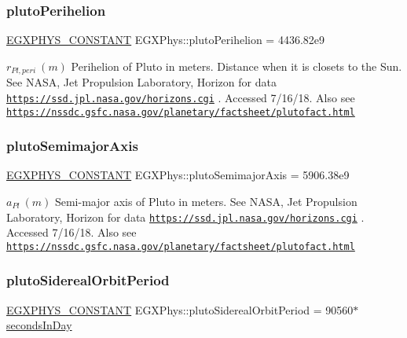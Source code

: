 \subsubsection{\texorpdfstring{pluto\+Perihelion}{plutoPerihelion}}
{\footnotesize\ttfamily \mbox{\hyperlink{group___e_g_x_phys-_constants-_macros_ga76980d288494ce1714c9ac68a95ba702}{E\+G\+X\+P\+H\+Y\+S\+\_\+\+C\+O\+N\+S\+T\+A\+NT}} E\+G\+X\+Phys\+::pluto\+Perihelion = 4436.\+82e9}

$ r_{Pl,peri} \ (m)$ Perihelion of Pluto in meters. Distance when it is closets to the Sun. See N\+A\+SA, Jet Propulsion Laboratory, Horizon for data \href{https://ssd.jpl.nasa.gov/horizons.cgi}{\tt https\+://ssd.\+jpl.\+nasa.\+gov/horizons.\+cgi} . Accessed 7/16/18. Also see \href{https://nssdc.gsfc.nasa.gov/planetary/factsheet/plutofact.html}{\tt https\+://nssdc.\+gsfc.\+nasa.\+gov/planetary/factsheet/plutofact.\+html} \mbox{\label{group___e_g_x_phys-_constants-_astrophysics-_solar_system-_pluto-_orbit_ga86f91cd8a0a651c7c26dcb86120a1d76}} 
\subsubsection{\texorpdfstring{pluto\+Semimajor\+Axis}{plutoSemimajorAxis}}
{\footnotesize\ttfamily \mbox{\hyperlink{group___e_g_x_phys-_constants-_macros_ga76980d288494ce1714c9ac68a95ba702}{E\+G\+X\+P\+H\+Y\+S\+\_\+\+C\+O\+N\+S\+T\+A\+NT}} E\+G\+X\+Phys\+::pluto\+Semimajor\+Axis = 5906.\+38e9}

$ a_{Pl} \ (m)$ Semi-\/major axis of Pluto in meters. See N\+A\+SA, Jet Propulsion Laboratory, Horizon for data \href{https://ssd.jpl.nasa.gov/horizons.cgi}{\tt https\+://ssd.\+jpl.\+nasa.\+gov/horizons.\+cgi} . Accessed 7/16/18. Also see \href{https://nssdc.gsfc.nasa.gov/planetary/factsheet/plutofact.html}{\tt https\+://nssdc.\+gsfc.\+nasa.\+gov/planetary/factsheet/plutofact.\+html} \mbox{\label{group___e_g_x_phys-_constants-_astrophysics-_solar_system-_pluto-_orbit_gaea7e18593aa211e20b0b0f43f196435a}} 
\subsubsection{\texorpdfstring{pluto\+Sidereal\+Orbit\+Period}{plutoSiderealOrbitPeriod}}
{\footnotesize\ttfamily \mbox{\hyperlink{group___e_g_x_phys-_constants-_macros_ga76980d288494ce1714c9ac68a95ba702}{E\+G\+X\+P\+H\+Y\+S\+\_\+\+C\+O\+N\+S\+T\+A\+NT}} E\+G\+X\+Phys\+::pluto\+Sidereal\+Orbit\+Period = 90560$\ast$\mbox{\hyperlink{namespace_e_g_x_phys_a93d2a00d75411b58cbf63ab3fd1f8bc2}{seconds\+In\+Day}}}

